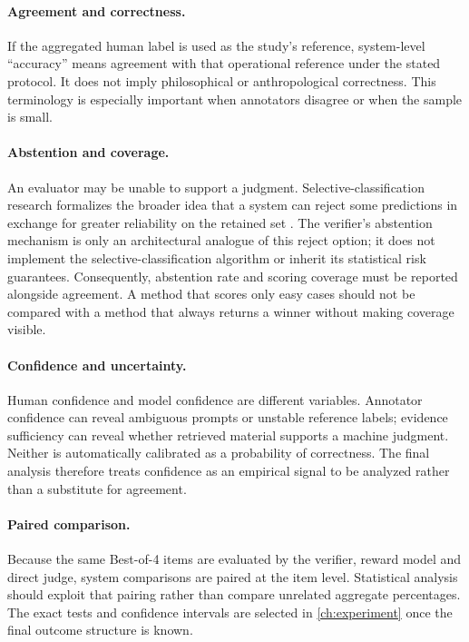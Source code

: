 \paragraph{Agreement and correctness.} If the aggregated human label is used as the study's reference, system-level ``accuracy'' means agreement with that operational reference under the stated protocol. It does not imply philosophical or anthropological correctness. This terminology is especially important when annotators disagree or when the sample is small.

\paragraph{Abstention and coverage.} An evaluator may be unable to support a judgment. Selective-classification research formalizes the broader idea that a system can reject some predictions in exchange for greater reliability on the retained set \parencite{geifman2017selective}. The verifier's abstention mechanism is only an architectural analogue of this reject option; it does not implement the selective-classification algorithm or inherit its statistical risk guarantees. Consequently, abstention rate and scoring coverage must be reported alongside agreement. A method that scores only easy cases should not be compared with a method that always returns a winner without making coverage visible.

\paragraph{Confidence and uncertainty.} Human confidence and model confidence are different variables. Annotator confidence can reveal ambiguous prompts or unstable reference labels; evidence sufficiency can reveal whether retrieved material supports a machine judgment. Neither is automatically calibrated as a probability of correctness. The final analysis therefore treats confidence as an empirical signal to be analyzed rather than a substitute for agreement.

\paragraph{Paired comparison.} Because the same Best-of-4 items are evaluated by the verifier, reward model and direct judge, system comparisons are paired at the item level. Statistical analysis should exploit that pairing rather than compare unrelated aggregate percentages. The exact tests and confidence intervals are selected in \cref{ch:experiment} once the final outcome structure is known.

